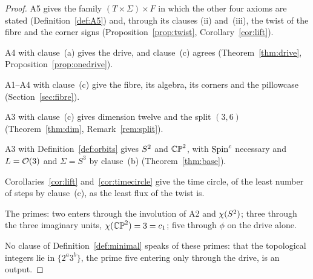 \documentclass[11pt,a4paper]{article}
\theoremstyle{plain}
\theoremstyle{definition}
\theoremstyle{remark}
\begin{document}
\begin{proof}
A5 gives the family $(T\times\Sigma)\times F$ in which the other four axioms are stated (Definition~\ref{def:A5}) and, through its clauses (ii) and~(iii), the twist of the fibre and the corner signs (Proposition~\ref{prop:twist}, Corollary~\ref{cor:lift}).

A4 with clause~(a) gives the drive, and clause~(c) agrees (Theorem~\ref{thm:drive}, Proposition~\ref{prop:onedrive}).

A1--A4 with clause~(c) give the fibre, its algebra, its corners and the pillowcase (Section~\ref{sec:fibre}).

A3 with clause~(c) gives dimension twelve and the split $(3,6)$ (Theorem~\ref{thm:dim}, Remark~\ref{rem:split}).

A3 with Definition~\ref{def:orbits} gives $S^2$ and $\mathbb{CP}^2$, with $\text{Spin}^c$ necessary and $L=\mathcal{O}(3)$ and $\Sigma=S^{3}$ by clause~(b) (Theorem~\ref{thm:base}).

Corollaries~\ref{cor:lift} and~\ref{cor:timecircle} give the time circle, of the least number of steps by clause~(c), as the least flux of the twist is.

The primes: two enters through the involution of A2 and $\chi(S^2)$; three through the three imaginary units, $\chi(\mathbb{CP}^2)=3=c_{1}$; five through $\phi$ on the drive alone.

No clause of Definition~\ref{def:minimal} speaks of these primes: that the topological integers lie in $\{2^{a}3^{b}\}$, the prime five entering only through the drive, is an output.
\end{proof}
\end{document}
